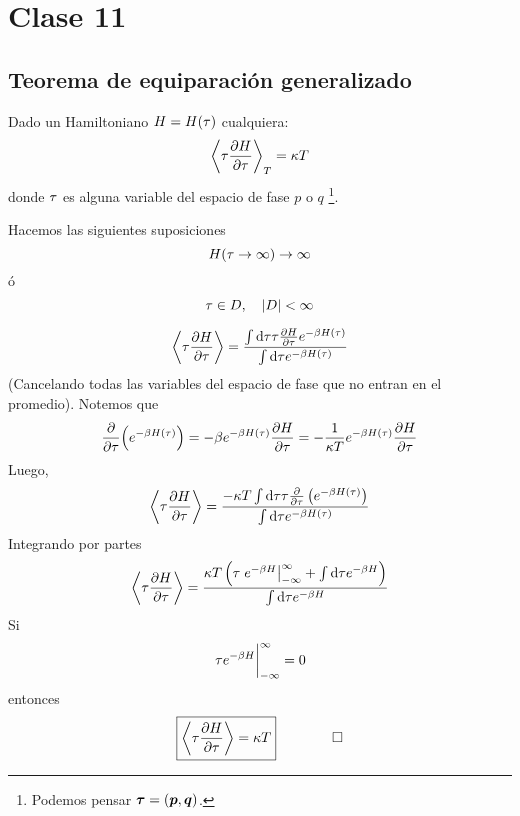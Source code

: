 \section{Clase 11}
\subsection{Teorema de equiparación generalizado}
\begin{teor}
Dado un Hamiltoniano $H=H(\tau )$ cualquiera:
\begin{equation}
  \ev{\t \pdv{H}{\t }}_T=\k T
\end{equation}
donde $\tau $ es alguna variable del espacio de fase $p$ o $q$ \footnote{Podemos pensar $\vb*{\tau }=(\vb*{p},\vb*{q})$.}.
	
\end{teor}

Hacemos las siguientes suposiciones
\begin{equation}
  H(\tau \to \infty)\to \infty
\end{equation}
ó
\begin{equation}
  \tau\in D,\quad |D|<\infty
\end{equation}

\begin{dem}
	\begin{equation}
  \ev{\t \pdv{H}{\t }}=\frac{\int\dd\t \t \pdv{H}{\t }e^{-\b H(\t )}}{\int\dd\t  e^{-\b H(\t )}}
\end{equation}
(Cancelando todas las variables del espacio de fase que no entran en el promedio). Notemos que
\begin{equation}
  \pdv{\tau}(e^{-\beta H(\tau )})=-\beta e^{-\beta H(\tau )}\pdv{H}{\tau}=-\frac{1}{\kappa T}e^{-\beta H(\tau )}\pdv{H}{\tau}
\end{equation}
Luego,
\begin{equation}
   \ev{\t \pdv{H}{\t }}=\frac{-\k T\int\dd\t \t\pdv{\t}\left( e^{-\b H(\t )}\right)}{\int\dd \t e^{-\b H(\t )}}
\end{equation}
Integrando por partes
\begin{equation}
  \ev{\t \pdv{H}{\t }}=\frac{\k T\left(\t \eval{e^{-\b H}}_{-\infty}^\infty +\int\dd \t e^{-\b H}\right)}{\int\dd\t e^{-\b H}}
\end{equation}
Si
\begin{equation}
\eval{  \t e^{-\b H}}_{-\infty}^\infty=0
\end{equation}
entonces
\begin{equation}
  \boxed{\ev{\t \pdv{H}{\t }}=\k T}\qquad \qed
\end{equation}
\end{dem}

